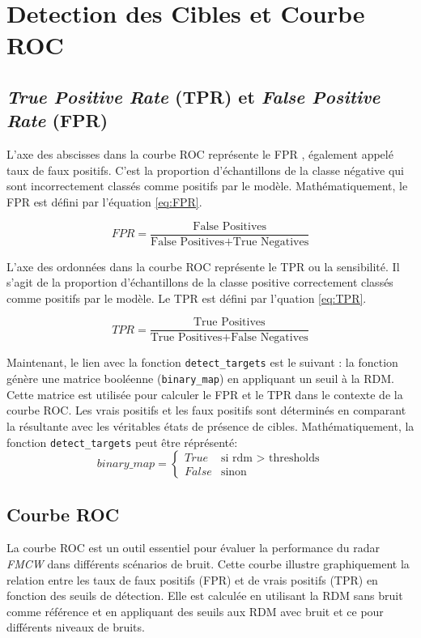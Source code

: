 \section{Detection des Cibles et Courbe ROC}
 
\subsection{\textit{True Positive Rate} (TPR) et \textit{False Positive Rate} (FPR)}

L'axe des abscisses dans la courbe ROC représente le FPR , également appelé taux de faux positifs. C'est la proportion d'échantillons de la classe négative qui sont incorrectement classés comme positifs par le modèle. Mathématiquement, le FPR est défini par l'équation \ref{eq:FPR}.

\begin{equation}
    FPR = \frac{\text{False Positives}}{\text{False Positives} + \text{True Negatives}}
    \label{eq:FPR}
\end{equation}


L'axe des ordonnées dans la courbe ROC représente le TPR  ou la sensibilité. Il s'agit de la proportion d'échantillons de la classe positive correctement classés comme positifs par le modèle. Le TPR est défini par l'quation \ref{eq:TPR}.

\begin{equation}
    TPR = \frac{\text{True Positives}}{\text{True Positives} + \text{False Negatives}}
    \label{eq:TPR}
\end{equation}

Maintenant, le lien avec la fonction \texttt{detect\_targets} est le suivant : la fonction génère une matrice booléenne (\texttt{binary\_map}) en appliquant un seuil à la RDM. Cette matrice est utilisée pour calculer le FPR et le TPR dans le contexte de la courbe ROC. Les vrais positifs et les faux positifs sont déterminés en comparant la résultante avec les véritables états de présence de cibles. Mathématiquement, la fonction \texttt{detect\_targets} peut être réprésenté:
\[
binary\_map=\begin{cases} 
True & \text{si } \text{{rdm > thresholds}} \\
False & \text{sinon}
\end{cases}
\]
\subsection{Courbe ROC }

La courbe ROC  est un outil essentiel pour évaluer la performance du radar \textit{FMCW} dans différents scénarios de bruit. Cette courbe illustre graphiquement la relation entre les taux de faux positifs (FPR) et de vrais positifs (TPR) en fonction des seuils de détection. Elle est calculée en utilisant la RDM sans bruit comme référence et en appliquant des seuils aux RDM avec bruit et ce pour différents niveaux de bruits.


